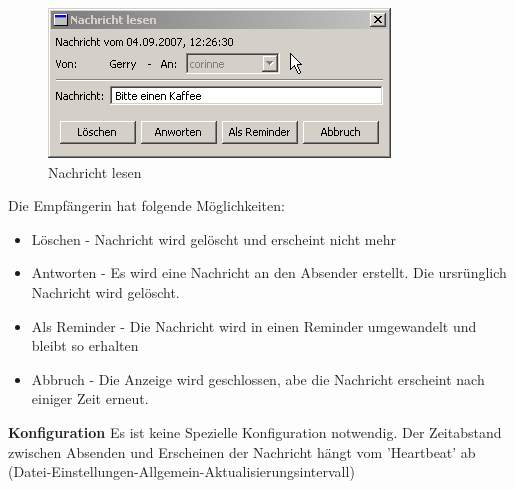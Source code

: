 \documentclass[a4paper]{scrartcl}
\begin{document}
\begin{figure}[htp]
    \includegraphics{newmsg3}
    \caption{Nachricht lesen}
\end{figure}

Die Empfängerin hat folgende Möglichkeiten: 
\begin{itemize}
\item Löschen - Nachricht wird gelöscht und erscheint nicht mehr
\item Antworten - Es wird eine Nachricht an den Absender erstellt. Die ursrünglich Nachricht wird gelöscht.
\item Als Reminder - Die Nachricht wird in einen Reminder umgewandelt und bleibt so erhalten
\item Abbruch - Die Anzeige wird geschlossen, abe die Nachricht erscheint nach einiger Zeit erneut.
\end{itemize}

\bigskip

\textbf{Konfiguration}
Es ist keine Spezielle Konfiguration notwendig. Der Zeitabstand zwischen Absenden und Erscheinen der Nachricht hängt vom 'Heartbeat' ab (Datei-Einstellungen-Allgemein-Aktualisierungsintervall)
\end{document}
